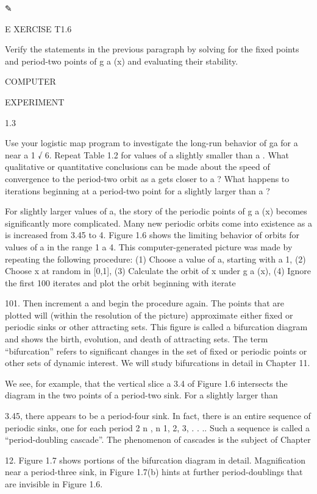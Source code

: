 \documentclass[12pt]{article}
\begin{document}
✎

E XERCISE T1.6

Verify the statements in the previous paragraph by solving for the ﬁxed points and period-two points of g 
a (x) and evaluating their stability.


COMPUTER

EXPERIMENT

1.3

Use your logistic map program to investigate the long-run behavior of ga  for a near a   1 √ 6. Repeat 
Table 1.2 for values of a slightly smaller than a  . What qualitative or quantitative conclusions can be 
made about the speed of convergence to the period-two orbit as a gets closer to a  ? What happens to 
iterations beginning at a period-two point for a slightly larger than a  ?

For slightly larger values of a, the story of the periodic points of g a (x) becomes signiﬁcantly more 
complicated. Many new periodic orbits come into existence as a is increased from 3.45 to 4. Figure 1.6 
shows the limiting behavior of orbits for values of a in the range 1   a  4. This computer-generated 
picture was made by repeating the following procedure: (1) Choose a value of a, starting with a  1, (2) 
Choose x at random in [0,1], (3) Calculate the orbit of x under g a (x), (4) Ignore the ﬁrst 100 iterates 
and plot the orbit beginning with iterate

101. Then increment a and begin the procedure again. The points that are plotted will (within the 
resolution of the picture) approximate either ﬁxed or periodic sinks or other attracting sets. This ﬁgure 
is called a bifurcation diagram and shows the birth, evolution, and death of attracting sets. The term 
“bifurcation” refers to signiﬁcant changes in the set of ﬁxed or periodic points or other sets of dynamic 
interest. We will study bifurcations in detail in Chapter 11.

We see, for example, that the vertical slice a  3.4 of Figure 1.6 intersects the diagram in the two points 
of a period-two sink. For a slightly larger than

3.45, there appears to be a period-four sink. In fact, there is an entire sequence of periodic sinks, one 
for each period 2 n , n  1, 2, 3, . . .. Such a sequence is called a “period-doubling cascade”. The 
phenomenon of cascades is the subject of Chapter

12. Figure 1.7 shows portions of the bifurcation diagram in detail. Magniﬁcation near a period-three sink, 
in Figure 1.7(b) hints at further period-doublings that are invisible in Figure 1.6.
\end{document}
